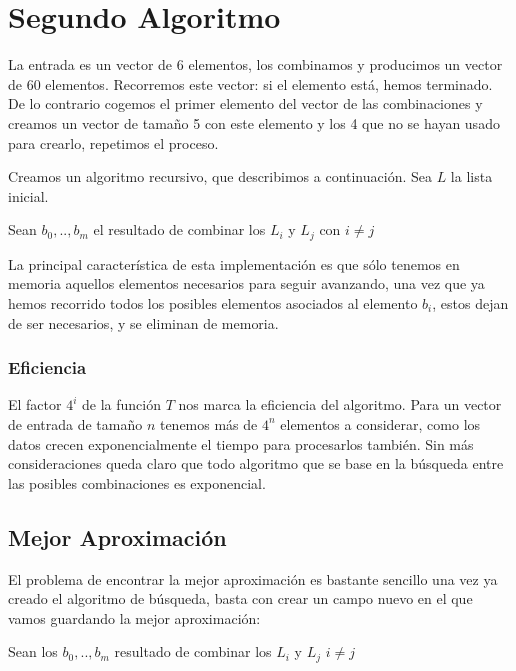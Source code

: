 \section{Segundo Algoritmo}
La entrada es un vector de 6 elementos, los combinamos y producimos un vector de
60 elementos. Recorremos este vector: si el elemento está, hemos terminado.
De lo contrario cogemos el primer elemento del vector de las combinaciones y
creamos un vector de tamaño 5 con este elemento y los 4 que no se hayan usado
para crearlo, repetimos el proceso.

Creamos un algoritmo recursivo, que describimos a continuación.
Sea $L$ la lista inicial.

\begin{algo}
 \hspace{0.25cm}	Sean $b_0,..,b_m$ el resultado de combinar los $L_i$ y $L_j$ con $i \neq j$  \;
\end{algo}

La principal característica de esta implementación es que sólo tenemos en memoria
aquellos elementos necesarios para seguir avanzando, una vez que ya hemos
recorrido todos los posibles elementos asociados al elemento $b_i$,
estos dejan de ser necesarios, y se eliminan de memoria.

\subsubsection{Eficiencia}

El factor $4^i$ de la función $T$ nos marca la eficiencia del algoritmo.
Para un vector de entrada de tamaño $n$ tenemos más de $4^n$ elementos a
considerar, como los datos crecen exponencialmente el tiempo para procesarlos
también. Sin más consideraciones queda claro que todo algoritmo que se base en
la búsqueda entre las posibles combinaciones es exponencial.

\subsection{Mejor Aproximación}
El problema de encontrar la mejor aproximación es bastante sencillo una vez
ya creado el algoritmo de búsqueda, basta con crear un campo nuevo en el que
vamos guardando la mejor aproximación:
\vspace{0.25cm}

\begin{algo}
 \hspace{0.25cm}	Sean los $b_0,..,b_m$ resultado de combinar los $L_i$ y $L_j$ $i \neq j$  \;
\end{algo}
